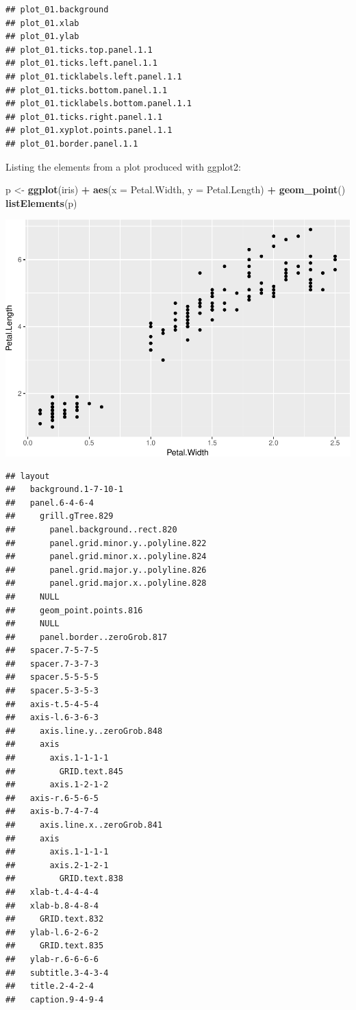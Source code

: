 \documentclass[11pt,]{report}
\newenvironment{Shaded}{\begin{snugshade}}{\end{snugshade}}
\newcommand{\KeywordTok}[1]{\textcolor[rgb]{0.13,0.29,0.53}{\textbf{#1}}}
\newcommand{\DataTypeTok}[1]{\textcolor[rgb]{0.13,0.29,0.53}{#1}}
\newcommand{\StringTok}[1]{\textcolor[rgb]{0.31,0.60,0.02}{#1}}
\newcommand{\OperatorTok}[1]{\textcolor[rgb]{0.81,0.36,0.00}{\textbf{#1}}}
\newcommand{\NormalTok}[1]{#1}
\begin{document}
\begin{verbatim}
## plot_01.background
## plot_01.xlab
## plot_01.ylab
## plot_01.ticks.top.panel.1.1
## plot_01.ticks.left.panel.1.1
## plot_01.ticklabels.left.panel.1.1
## plot_01.ticks.bottom.panel.1.1
## plot_01.ticklabels.bottom.panel.1.1
## plot_01.ticks.right.panel.1.1
## plot_01.xyplot.points.panel.1.1
## plot_01.border.panel.1.1
\end{verbatim}

Listing the elements from a plot produced with \textsf{ggplot2}:

\begin{Shaded}
\begin{Highlighting}[]
\NormalTok{p <-}\StringTok{ }\KeywordTok{ggplot}\NormalTok{(iris) }\OperatorTok{+}\StringTok{ }\KeywordTok{aes}\NormalTok{(}\DataTypeTok{x =}\NormalTok{ Petal.Width, }\DataTypeTok{y =}\NormalTok{ Petal.Length) }\OperatorTok{+}\StringTok{ }\KeywordTok{geom_point}\NormalTok{()}
\KeywordTok{listElements}\NormalTok{(p)}
\end{Highlighting}
\end{Shaded}

\begin{center}\includegraphics{figures/unnamed-chunk-91-1} \end{center}

\begin{verbatim}
## layout
##   background.1-7-10-1
##   panel.6-4-6-4
##     grill.gTree.829
##       panel.background..rect.820
##       panel.grid.minor.y..polyline.822
##       panel.grid.minor.x..polyline.824
##       panel.grid.major.y..polyline.826
##       panel.grid.major.x..polyline.828
##     NULL
##     geom_point.points.816
##     NULL
##     panel.border..zeroGrob.817
##   spacer.7-5-7-5
##   spacer.7-3-7-3
##   spacer.5-5-5-5
##   spacer.5-3-5-3
##   axis-t.5-4-5-4
##   axis-l.6-3-6-3
##     axis.line.y..zeroGrob.848
##     axis
##       axis.1-1-1-1
##         GRID.text.845
##       axis.1-2-1-2
##   axis-r.6-5-6-5
##   axis-b.7-4-7-4
##     axis.line.x..zeroGrob.841
##     axis
##       axis.1-1-1-1
##       axis.2-1-2-1
##         GRID.text.838
##   xlab-t.4-4-4-4
##   xlab-b.8-4-8-4
##     GRID.text.832
##   ylab-l.6-2-6-2
##     GRID.text.835
##   ylab-r.6-6-6-6
##   subtitle.3-4-3-4
##   title.2-4-2-4
##   caption.9-4-9-4
\end{verbatim}
\end{document}
